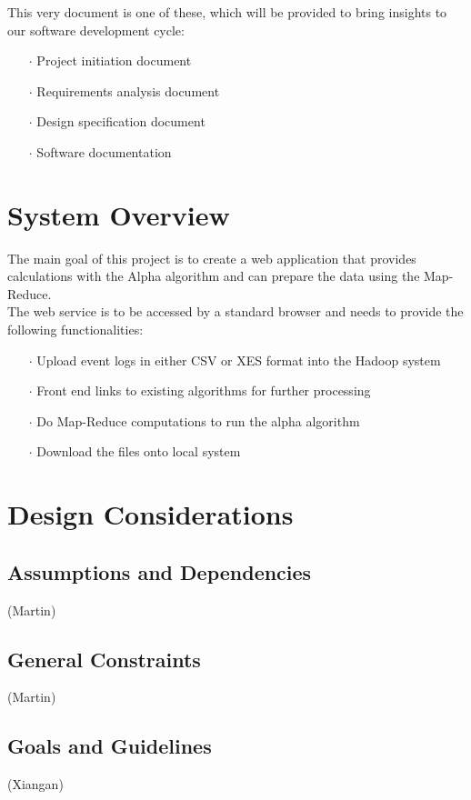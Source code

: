 \documentclass[runningheads]{llncs}
\begin{document}
\noindent
This very document is one of these, which will be provided to bring insights to our software development cycle:

\begin{itemize}
	\item[\Large $\cdot$]  Project initiation document
	\item[\Large $\cdot$]  Requirements analysis document
	\item[\Large $\cdot$]  Design specification document
	\item[\Large $\cdot$]  Software documentation
\end{itemize}

\section{System Overview}
The main goal of this project is to create a web application that provides calculations with the Alpha algorithm and can prepare the data using the Map-Reduce. \\

\noindent
The web service is to be accessed by a standard browser and needs to provide the following functionalities:
\begin{itemize}
	\item[\Large $\cdot$] Upload event logs in either CSV or XES format into the Hadoop system
	\item[\Large $\cdot$] Front end links to existing algorithms for further processing
	\item[\Large $\cdot$] Do Map-Reduce computations to run the alpha algorithm
	\item[\Large $\cdot$] Download the files onto local system
\end{itemize}

\section{Design Considerations}
\subsection{Assumptions and Dependencies}
(Martin)
\subsection{General Constraints}
(Martin)
\subsection{Goals and Guidelines}
(Xiangan)
\end{document}

